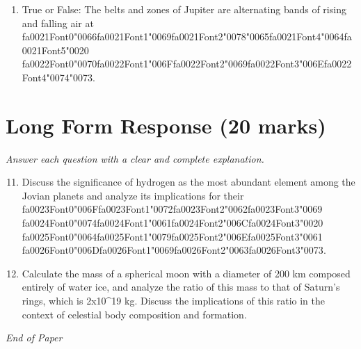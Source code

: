 \documentclass[12pt]{article}
\begin{document}
\begin{enumerate}[label=\arabic*.]
\item True or False: The belts and zones of Jupiter are alternating bands of rising and falling air at {\csname fa0021Font0\endcsname\char"0066}{\csname fa0021Font1\endcsname\char"0069}{\csname fa0021Font2\endcsname\char"0078}{\char"0065}{\csname fa0021Font4\endcsname\char"0064}{\csname fa0021Font5\endcsname\char"0020} {\csname fa0022Font0\endcsname\char"0070}{\csname fa0022Font1\endcsname\char"006F}{\csname fa0022Font2\endcsname\char"0069}{\csname fa0022Font3\endcsname\char"006E}{\csname fa0022Font4\endcsname\char"0074}{\char"0073}.
\end{enumerate}

\section*{Long Form Response (20 marks)}
\textit{Answer each question with a clear and complete explanation.}
\begin{enumerate}[label=\arabic*.]
\setcounter{enumi}{10}
\item Discuss the significance of hydrogen as the most abundant element among the Jovian planets
and analyze its implications for their {\csname fa0023Font0\endcsname\char"006F}{\csname fa0023Font1\endcsname\char"0072}{\csname fa0023Font2\endcsname\char"0062}{\csname fa0023Font3\endcsname\char"0069} {\csname fa0024Font0\endcsname\char"0074}{\csname fa0024Font1\endcsname\char"0061}{\csname fa0024Font2\endcsname\char"006C}{\csname fa0024Font3\endcsname\char"0020} {\csname fa0025Font0\endcsname\char"0064}{\csname fa0025Font1\endcsname\char"0079}{\csname fa0025Font2\endcsname\char"006E}{\csname fa0025Font3\endcsname\char"0061} {\csname fa0026Font0\endcsname\char"006D}{\csname fa0026Font1\endcsname\char"0069}{\csname fa0026Font2\endcsname\char"0063}{\csname fa0026Font3\endcsname\char"0073}.
\item Calculate the mass of a spherical moon with a diameter of 200 km composed entirely of
water ice, and analyze the ratio of this mass to that of Saturn's rings, which is 2x10\^{}19
kg. Discuss the implications of this ratio in the context of celestial body composition
and formation.
\end{enumerate}

\vfill
\noindent\textit{End of Paper}
\end{document}
